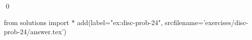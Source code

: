 
\begin{ex} 
  \label{ex:disc-prob-24}
  
  \qed
\end{ex} 
\begin{python0}
from solutions import *
add(label="ex:disc-prob-24",
    srcfilename='exercises/disc-prob-24/answer.tex') 
\end{python0}
